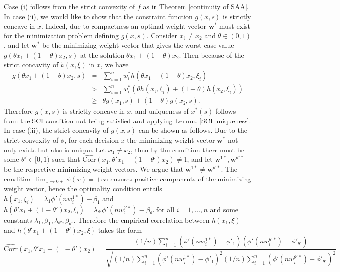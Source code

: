 \documentclass[mnsc,blindrev]{informs4} %
\begin{document}
Case (i) follows from the strict convexity of $f$ as in Theorem \ref{continuity of SAA}. In case (ii), we would like to show that the constraint function $g(x,s)$ is strictly concave in $x$. Indeed, due to compactness an optimal weight vector $\mathbf w^*$ must exist for the minimization problem defining $g(x,s)$. Consider $x_1\neq x_2$ and $\theta\in(0,1)$, and let $\mathbf w^*$ be the minimizing weight vector that gives the worst-case value $g(\theta x_1+(1-\theta)x_2,s)$ at the solution $\theta x_1+(1-\theta)x_2$. Then because of the strict concavity of $h(x,\xi)$ in $x$, we have
\begin{eqnarray*}
g(\theta x_1+(1-\theta)x_2,s)&=&\sum_{i=1}^nw^*_ih(\theta x_1+(1-\theta)x_2,\xi_i)\\
&>&\sum_{i=1}^nw^*_i(\theta h(x_1,\xi_i)+(1-\theta)h(x_2,\xi_i))\\
&\geq&\theta g(x_1,s)+(1-\theta)g(x_2,s).
\end{eqnarray*}
Therefore $g(x,s)$ is strictly concave in $x$, and uniqueness of $x^*(s)$ follows from the SCI condition not being satisfied and applying Lemma \ref{SCI uniqueness}. In case (iii), the strict concavity of $g(x,s)$ can be shown as follows. Due to the strict convexity of $\phi$, for each decision $x$ the minimizing weight vector $\mathbf w^*$ not only exists but also is unique. Let $x_1\neq x_2$, then by the condition there must be some $\theta'\in [0,1)$ such that $\widehat{\mathrm{Corr}}(x_1,\theta' x_1+(1-\theta')x_2)\neq 1$, and let $\mathbf w^{1*}, \mathbf w^{\theta'*}$ be the respective minimizing weight vectors. We argue that $\mathbf w^{1*}\neq\mathbf w^{\theta'*}$. The condition $\lim_{x\to 0+}\phi(x)=+\infty$ ensures positive components of the minimizing weight vector, hence the optimality condition entails $h(x_1,\xi_i)=\lambda_1\phi'(nw_i^{1*})-\beta_1$ and $h(\theta' x_1+(1-\theta')x_2,\xi_i)=\lambda_{\theta'}\phi'(nw_i^{\theta'*})-\beta_{\theta'}$ for all $i=1,\ldots,n$ and some constants $\lambda_1,\beta_1,\lambda_{\theta'},\beta_{\theta'}$. Therefore the empirical correlation between $h(x_1,\xi)$ and $h(\theta'x_1+(1-\theta')x_2,\xi)$ takes the form
\begin{equation*}
\widehat{\mathrm{Corr}}(x_1,\theta' x_1+(1-\theta')x_2)=\frac{(1/n)\sum_{i=1}^n(\phi'(nw^{1*}_i)-\bar{\phi'_1})(\phi'(nw^{\theta'*}_i)-\bar{\phi'_{\theta'}})}{\sqrt{(1/n)\sum_{i=1}^n(\phi'(nw^{1*}_i)-\bar{\phi'_1})^2(1/n)\sum_{i=1}^n(\phi'(nw^{\theta'*}_i)-\bar{\phi'_{\theta'}})^2}}
\end{equation*}
\end{document}
